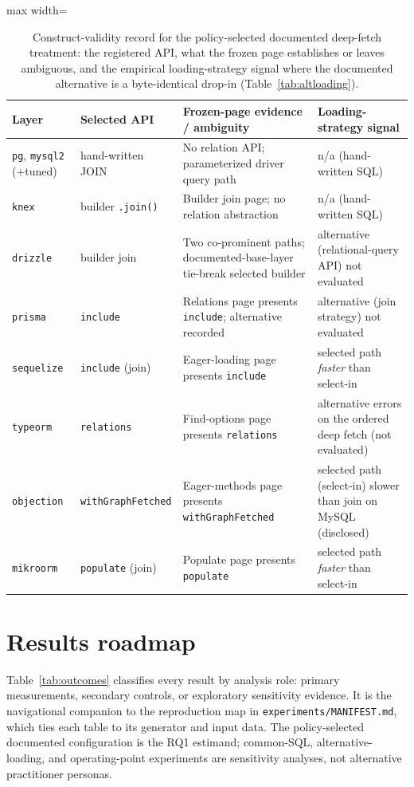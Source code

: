 \documentclass[11pt,a4paper]{article}
\begin{document}
\begin{table}[htbp]
  \centering
  \footnotesize
  \caption{Construct-validity record for the policy-selected documented deep-fetch treatment: the registered API, what the frozen page establishes or leaves ambiguous, and the empirical loading-strategy signal where the documented
    alternative is a byte-identical drop-in (Table~\ref{tab:altloading}).}
  \label{tab:construct}
  \begin{adjustbox}{max width=\textwidth}
  \begin{tabular}{@{}l l p{} p{}@{}}
    \toprule
    Layer & Selected API & Frozen-page evidence / ambiguity & Loading-strategy signal \\
    \midrule
    \texttt{pg}, \texttt{mysql2} (+tuned) & hand-written JOIN & No relation API; parameterized driver query path & n/a (hand-written SQL) \\
    \texttt{knex} & builder \texttt{.join()} & Builder join page; no relation abstraction & n/a (hand-written SQL) \\
    \texttt{drizzle} & builder join & Two co-prominent paths; documented-base-layer tie-break selected builder & alternative (relational-query API) not evaluated \\
    \texttt{prisma} & \texttt{include} & Relations page presents \texttt{include}; alternative recorded & alternative (join strategy) not evaluated \\
    \texttt{sequelize} & \texttt{include} (join) & Eager-loading page presents \texttt{include} & selected path \emph{faster} than select-in \\
    \texttt{typeorm} & \texttt{relations} & Find-options page presents \texttt{relations} & alternative errors on the ordered deep fetch (not evaluated) \\
    \texttt{objection} & \texttt{withGraphFetched} & Eager-methods page presents \texttt{withGraphFetched} & selected path (select-in) slower than join on MySQL (disclosed) \\
    \texttt{mikroorm} & \texttt{populate} (join) & Populate page presents \texttt{populate} & selected path \emph{faster} than select-in \\
    \bottomrule
  \end{tabular}
  \end{adjustbox}
\end{table}

\section{Results roadmap}
\label{sup:outcomes}
Table~\ref{tab:outcomes} classifies every result by analysis role: primary measurements,
secondary controls, or exploratory sensitivity evidence. It is the navigational companion to the
reproduction map in \texttt{experiments/MANIFEST.md}, which ties each table to its generator and
input data. The policy-selected documented configuration is the RQ1 estimand; common-SQL,
alternative-loading, and operating-point experiments are sensitivity analyses, not alternative
practitioner personas.
\end{document}
